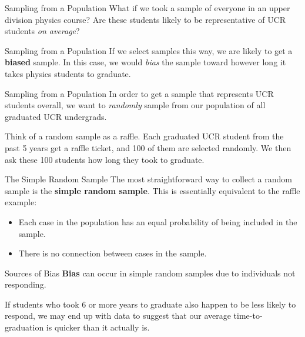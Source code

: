 \begin{frame}{Sampling from a Population}    
    \vspace{12pt}
    What if we took a sample of everyone in an upper division physics course? Are these students likely to be representative of UCR students \textit{on average}?
\end{frame}
 
\begin{frame}{Sampling from a Population}     
    \vspace{12pt}
    If we select samples this way, we are likely to get a \textbf{biased} sample. In this case, we would \textit{bias} the sample toward however long it takes physics students to graduate. 
\end{frame}

\begin{frame}{Sampling from a Population}
    In order to get a sample that represents UCR students overall, we want to \textit{randomly} sample from our population of all graduated UCR undergrads.
    
    \vspace{12pt}
    Think of a random sample as a raffle. Each graduated UCR student from the past 5 years get a raffle ticket, and 100 of them are selected randomly. We then ask these 100 students how long they took to graduate. 
\end{frame}

\begin{frame}{The Simple Random Sample}
    The most straightforward way to collect a random sample is the \textbf{simple random sample}. This is essentially equivalent to the raffle example:
    \begin{itemize}
        \item Each case in the population has an equal probability of being included in the sample.
        \item There is no connection between cases in the sample.
    \end{itemize}  
\end{frame}

\begin{frame}{Sources of Bias}
    \textbf{Bias} can occur in simple random samples due to individuals not responding. 
    
    \vspace{12pt}
    If students who took 6 or more years to graduate also happen to be less likely to respond, we may end up with data to suggest that our average time-to-graduation is quicker than it actually is. 
\end{frame}

